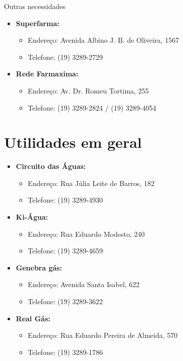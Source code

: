 \begin{story}{Outras necessidades}
\begin{itemize}
\item \textbf{Superfarma:}
\begin{itemize}
\item Endereço: Avenida Albino J. B. de Oliveira, 1567
\item Telefone: (19) 3289-2729
\end{itemize}

\item \textbf{Rede Farmaxima:}
\begin{itemize}
\item Endereço: Av. Dr. Romeu Tortima, 255
\item Telefone: (19) 3289-2824 / (19) 3289-4054
\end{itemize}

\end{itemize}

\section*{Utilidades em geral}

\begin{itemize}

\item \textbf{Circuito das Águas:}
\begin{itemize}
\item Endereço: Rua Júlia Leite de Barros, 182
\item Telefone: (19) 3289-4930
\end{itemize}

\item \textbf{Ki-Água:}
\begin{itemize}
\item Endereço: Rua Eduardo Modesto, 240
\item Telefone: (19) 3289-4659
\end{itemize}

\item \textbf{Genebra gás:}
\begin{itemize}
\item Endereço: Avenida Santa Isabel, 622
\item Telefone: (19) 3289-3622
\end{itemize}

\item \textbf{Real Gás:}
\begin{itemize}
\item Endereço: Rua Eduardo Pereira de Almeida, 570
\item Telefone: (19) 3289-1786
\end{itemize}


\end{itemize}
\end{story}
